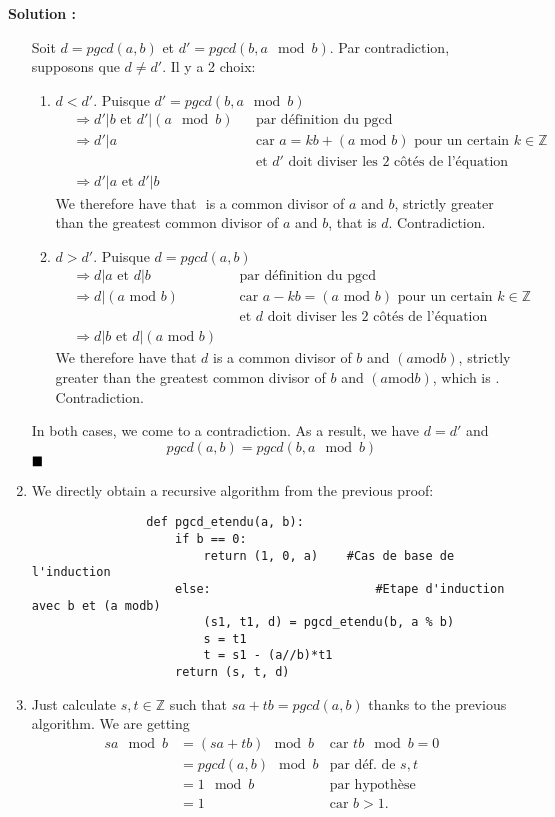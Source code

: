 \documentclass[11pt]{article} %
\newenvironment{solution}[1][\unskip]{%
	\par
	\noindent
	\textbf{Solution #1:}
	\noindent}
{\medskip}
\begin{document}
\begin{solution}
\begin{enumerate}
			Soit $d = pgcd(a,b)$ et $d'=pgcd(b, a\mod b)$. Par contradiction, supposons que $d\neq d'$. Il y a 2 choix:
			\begin{enumerate}
				\item $d<d'$. Puisque $d' = pgcd(b, a\mod b)$
				\begin{align*}
					&\Rightarrow d'|b \text{ et } d'|(a\mod b) &&\text{par définition du pgcd}\\
					&\Rightarrow d'|a &&\text{car $a = kb + (a\text{ mod } b)$ pour un certain $k\in \mathbb{Z}$}\\
					& &&\text{et $d'$ doit diviser les 2 côtés de l'équation}\\
					&\Rightarrow d'|a \text{ et } d'|b					
				\end{align*}
				We therefore have that $ $ is a common divisor of $ a $ and $ b $, strictly greater than the greatest common divisor of $ a $ and $ b $, that is $ d $. Contradiction.

				\item $d>d'$.  Puisque $d = pgcd(a,b)$
				\begin{align*}
				&\Rightarrow d|a \text{ et } d|b  &&\text{par définition du pgcd}\\
				&\Rightarrow d|(a\text{ mod }b) &&\text{car $a -kb= (a\text{ mod } b)$ pour un certain $k\in \mathbb{Z}$}\\
				& &&\text{et $d$ doit diviser les 2 côtés de l'équation}\\
				&\Rightarrow d|b \text{ et } d|(a\text{ mod }b)					
				\end{align*}
				We therefore have that $ d $ is a common divisor of $ b $ and $ (a \text {mod} b) $, strictly greater than the greatest common divisor of $ b $ and $ (a \text {mod} b) $, which is $ $. Contradiction.
			\end{enumerate}
			In both cases, we come to a contradiction. As a result, we have $ d = d '$ and $$ pgcd (a, b) = pgcd (b, a \mod b) $$ $ \hfill \blacksquare $
			
			
			\item{We directly obtain a recursive algorithm from the previous proof:
				\begin{lstlisting}
				def pgcd_etendu(a, b):
					if b == 0:
						return (1, 0, a)	#Cas de base de l'induction
					else:						#Etape d'induction avec b et (a modb)
						(s1, t1, d) = pgcd_etendu(b, a % b)
						s = t1				
						t = s1 - (a//b)*t1
					return (s, t, d) 
				\end{lstlisting}}
			\item{Just calculate $ s, t \in \mathbb {Z} $ such that $ sa + tb = pgcd (a, b) $ thanks to the previous algorithm. We are getting
				\begin{align*}
				sa \mod b &= (sa + tb) \mod b & \text{car }tb \mod b = 0\\
				&= pgcd(a,b) \mod b & \text{par déf. de }s, t\\
				&= 1 \mod b & \text{par hypothèse}\\
				&= 1 & \text{car }b>1.
				\end{align*}}
		\end{enumerate}
	\end{solution}
	
	
	
\end{document}
